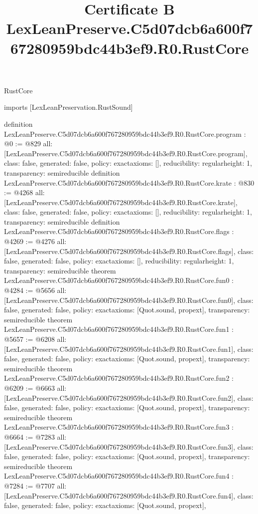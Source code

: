 \begin{lexlean}{RustCore}
\title{Certificate B LexLeanPreserve.C5d07dcb6a600f767280959bdc44b3ef9.R0.RustCore}
\begin{coremodule}
imports [LexLeanPreservation.RustSound]

definition LexLeanPreserve.C5d07dcb6a600f767280959bdc44b3ef9.R0.RustCore.program : @0 := @829 {
  all: [LexLeanPreserve.C5d07dcb6a600f767280959bdc44b3ef9.R0.RustCore.program],
  class: false,
  generated: false,
  policy: exact{axioms: []},
  reducibility: regular{height: 1},
  transparency: semireducible
}
definition LexLeanPreserve.C5d07dcb6a600f767280959bdc44b3ef9.R0.RustCore.krate : @830 := @4268 {
  all: [LexLeanPreserve.C5d07dcb6a600f767280959bdc44b3ef9.R0.RustCore.krate],
  class: false,
  generated: false,
  policy: exact{axioms: []},
  reducibility: regular{height: 1},
  transparency: semireducible
}
definition LexLeanPreserve.C5d07dcb6a600f767280959bdc44b3ef9.R0.RustCore.flags : @4269 := @4276 {
  all: [LexLeanPreserve.C5d07dcb6a600f767280959bdc44b3ef9.R0.RustCore.flags],
  class: false,
  generated: false,
  policy: exact{axioms: []},
  reducibility: regular{height: 1},
  transparency: semireducible
}
theorem LexLeanPreserve.C5d07dcb6a600f767280959bdc44b3ef9.R0.RustCore.fun0 : @4284 := @5656 {
  all: [LexLeanPreserve.C5d07dcb6a600f767280959bdc44b3ef9.R0.RustCore.fun0],
  class: false,
  generated: false,
  policy: exact{axioms: [Quot.sound, propext]},
  transparency: semireducible
}
theorem LexLeanPreserve.C5d07dcb6a600f767280959bdc44b3ef9.R0.RustCore.fun1 : @5657 := @6208 {
  all: [LexLeanPreserve.C5d07dcb6a600f767280959bdc44b3ef9.R0.RustCore.fun1],
  class: false,
  generated: false,
  policy: exact{axioms: [Quot.sound, propext]},
  transparency: semireducible
}
theorem LexLeanPreserve.C5d07dcb6a600f767280959bdc44b3ef9.R0.RustCore.fun2 : @6209 := @6663 {
  all: [LexLeanPreserve.C5d07dcb6a600f767280959bdc44b3ef9.R0.RustCore.fun2],
  class: false,
  generated: false,
  policy: exact{axioms: [Quot.sound, propext]},
  transparency: semireducible
}
theorem LexLeanPreserve.C5d07dcb6a600f767280959bdc44b3ef9.R0.RustCore.fun3 : @6664 := @7283 {
  all: [LexLeanPreserve.C5d07dcb6a600f767280959bdc44b3ef9.R0.RustCore.fun3],
  class: false,
  generated: false,
  policy: exact{axioms: [Quot.sound, propext]},
  transparency: semireducible
}
theorem LexLeanPreserve.C5d07dcb6a600f767280959bdc44b3ef9.R0.RustCore.fun4 : @7284 := @7707 {
  all: [LexLeanPreserve.C5d07dcb6a600f767280959bdc44b3ef9.R0.RustCore.fun4],
  class: false,
  generated: false,
  policy: exact{axioms: [Quot.sound, propext]},
}
\end{coremodule}
\end{lexlean}
